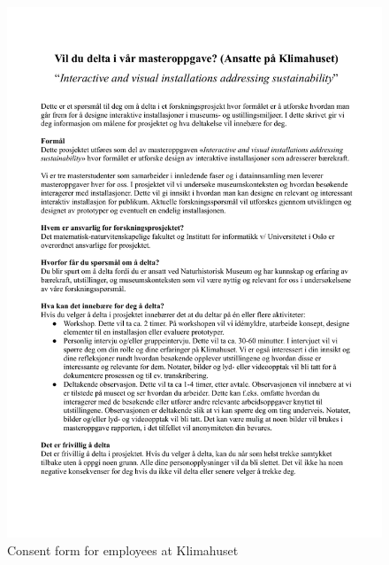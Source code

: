 \begin{figure}[H]
\includegraphics[width=12.5cm]{pictures/appendix/Samtykkeskjema_klimahuset.pdf}
\caption{Consent form for employees at Klimahuset}
\end{figure}


